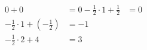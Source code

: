 \documentclass[preview]{standalone}
\begin{document}
\begin{align*}
0 + 0 & = 0 - \frac{1}{2}\cdot1 + \frac{1}{2} & = 0 \\ -\frac{1}{2}\cdot1 + (-\frac{1}{2}) & = -1 \\ - \frac{1}{2}\cdot2 + 4  & = 3 \\
\end{align*}
\end{document}
